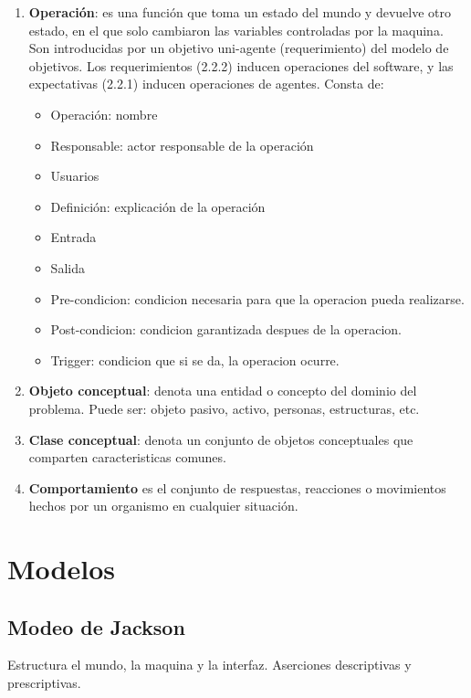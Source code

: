 \begin{enumerate}
\item {\bf Operaci\'on}: es una funci\'on que toma un estado del mundo y devuelve otro estado, en el que solo cambiaron las variables controladas por la maquina. Son introducidas por un objetivo uni-agente (requerimiento) del modelo de objetivos. Los requerimientos (2.2.2) inducen operaciones del software, y las expectativas (2.2.1) inducen operaciones de agentes. Consta de: 
  \begin{itemize}
    \item Operaci\'on: nombre
    \item Responsable: actor responsable de la operaci\'on
    \item Usuarios
    \item Definici\'on: explicaci\'on de la operaci\'on
    \item Entrada
    \item Salida
    \item Pre-condicion: condicion necesaria para que la operacion pueda realizarse.
    \item Post-condicion: condicion garantizada despues de la operacion. 
    \item Trigger: condicion que si se da, la operacion ocurre. 
  \end{itemize}
  
\item {\bf Objeto conceptual}: denota una entidad o concepto del dominio del problema. Puede ser: objeto pasivo, activo, personas, estructuras, etc. 

\item {\bf Clase conceptual}: denota un conjunto de objetos conceptuales que comparten caracteristicas comunes. 

\item {\bf Comportamiento} es el conjunto de respuestas, reacciones o movimientos hechos por un organismo en cualquier situaci\'on. 

\end{enumerate}

\section{Modelos}

\subsection{Modeo de Jackson}

  Estructura el mundo, la maquina y la interfaz. Aserciones descriptivas y prescriptivas. 

